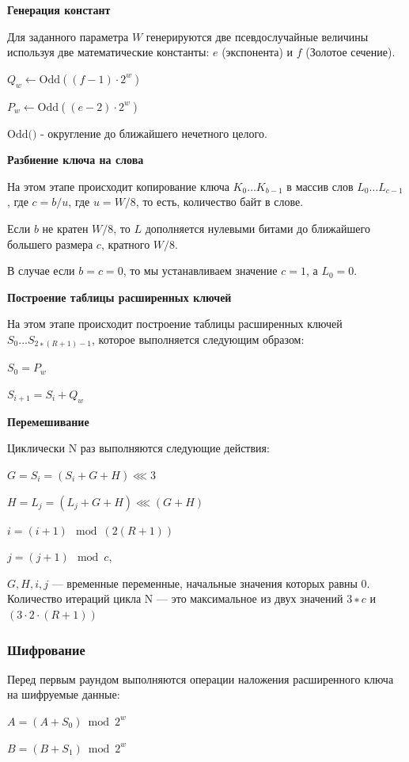 \documentclass[a4paper]{report}
\begin{document}
\textbf{Генерация констант}

Для заданного параметра $W$ генерируются две псевдослучайные величины используя две математические константы: $e$ (экспонента) и $f$ (Золотое сечение).

$Q_w \leftarrow \textrm{Odd}((f − 1)\cdot 2^w)$

$P_w \leftarrow \textrm{Odd}((e − 2)\cdot 2^w)$

$\textrm{Odd()}$ - округление до ближайшего нечетного целого.

\textbf{Разбиение ключа на слова}

На этом этапе происходит копирование ключа $K_0 … K_{b − 1}$ в массив слов $L_0… L_{c − 1}$, где $c = b / u$, где $u = W / 8$, то есть, количество байт в слове.

Если $b$ не кратен $W / 8$, то $L$ дополняется нулевыми битами до ближайшего большего размера $c$, кратного $W / 8$.

В случае если $b = c = 0$, то мы устанавливаем значение $c = 1$, а $L_0 = 0$.

\textbf{Построение таблицы расширенных ключей}

На этом этапе происходит построение таблицы расширенных ключей $S_0 … S_{2 ∗ ( R + 1 ) − 1}$, которое выполняется следующим образом: 

$S_{0}=P_{w}$

$S_{i+1}=S_i+Q_w$

\textbf{Перемешивание}

Циклически N раз выполняются следующие действия:

${\displaystyle G=S_{i}=(S_{i}+G+H)\lll 3}$

${\displaystyle H=L_{j}=(L_{j}+G+H)\lll (G+H)}$

${\displaystyle i=(i+1)\mod (2(R+1))}$

${\displaystyle j=(j+1)\mod c}$,

$G, H, i, j$ — временные переменные, начальные значения которых равны 0. Количество итераций цикла N — это максимальное из двух значений $3 ∗ c$ и $(3 \cdot 2 \cdot (R + 1))$ 

\subsubsection{Шифрование}
Перед первым раундом выполняются операции наложения расширенного ключа на шифруемые данные:

$A=(A+S_0) \bmod {2^{w}}$

$B=(B+S_1)\bmod {2^{w}}$
\end{document}
